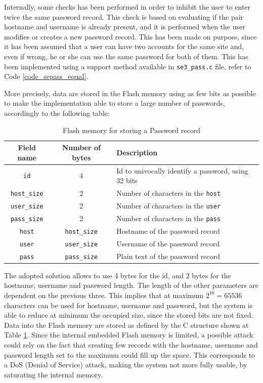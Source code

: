 Internally, some checks has been performed in order to inhibit the user to enter twice the same password record. This check is based on evaluating if the pair hostname and username is already present, and it is performed when the user modifies or creates a new password record. This has been made on purpose, since it has been assumed that a user can have two accounts for the same site and, even if wrong, he or she can use the same password for both of them. This has been implemented using a support method available in \texttt{se3\_pass.c} file, refer to Code \ref{code_sepass_equal}.

More precisely, data are stored in the Flash memory using as few bits as possible to make the implementation able to store a large number of passwords, accordingly to the following table:
\begin{table}[H]
	\begin{tabular}{ |c c l| }
		\hline
		\textbf{Field name} & \textbf{Number of bytes} & \textbf{Description}\\ 
		\hline
		\texttt{id} & 4 & Id to univocally identify a password, using 32 bits\\ 
		\hline
		\texttt{host\_size} & 2 & Number of characters in the \texttt{host} \\  
		\hline
		\texttt{user\_size} & 2 &  Number of characters in the \texttt{user} \\  
		\hline
		\texttt{pass\_size} & 2 &  Number of characters in the \texttt{pass} \\  
		\hline
		\texttt{host} & \texttt{host\_size} & Hostname of the password record \\  
		\hline
		\texttt{user} & \texttt{user\_size} & Username of the password record\\  
		\hline
		\texttt{pass} & \texttt{pass\_size} & Plain text of the password record\\  
		\hline
	\end{tabular}
	\caption{Flash memory for storing a Password record}
	\label{tab:flashmem_pass}
\end{table}

The adopted solution allows to use 4 bytes for the id, and 2 bytes for the hostname, username and password length. The length of the other parameters are dependent on the previous three. This implies that at maximum $2^{16} = 65536$ characters can be used for hostname, username and password, but the system is able to reduce at minimum the occupied size, since the stored bits are not fixed.\newline\newline
Data into the Flash memory are stored as defined by the C structure shown at Table \ref{tab:flashmem_pass}. Since the internal embedded Flash memory is limited, a possible attack could rely on the fact that creating few records with the hostname, username and password length set to the maximum could fill up the space. This corresponds to a DoS (Denial of Service) attack, making the system not more fully usable, by saturating the internal memory.

